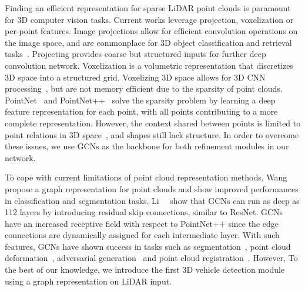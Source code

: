 \documentclass[10pt,twocolumn,letterpaper]{article}
\begin{document}
Finding an efficient representation for sparse LiDAR point clouds is paramount for 3D computer vision tasks. 
Current works leverage projection, voxelization or per-point features.
Image projections allow for efficient convolution operations on the image space, and are commonplace for 3D object classification and retrieval tasks~\cite{su2015multi,qi2016volumetric,tatarchenko2018tangent}.
Projecting provides coarse but structured inputs for further deep convolution network.
Voxelization is a volumetric representation that discretizes 3D space into a structured grid.
Voxelizing 3D space allows for 3D CNN processing~\cite{wu20153d,maturana2015voxnet,riegler2017octnet}, but are not memory efficient due to the sparsity of point clouds.
PointNet~\cite{qi2017pointnet} and PointNet++~\cite{qi2017pointnet++} solve the sparsity problem by learning a deep feature representation for each point, with all points contributing to a more complete representation.
However, the context shared between points is limited to point relations in 3D space~\cite{qi2017pointnet++}, and shapes still lack structure.
In order to overcome these issues, we use GCNs as the backbone for both refinement modules in our network.










To cope with current limitations of point cloud representation methods, Wang~\etal~\cite{wang2019dynamic} propose a graph representation for point clouds and show improved performances in classification and segmentation tasks.
Li~\etal~\cite{li2019deepgcns_journal} show that GCNs can run as deep as 112 layers by introducing residual skip connections, similar to ResNet. 
GCNs have an increased receptive field with respect to PointNet++\cite{qi2017pointnet++} since the edge connections are dynamically assigned for each intermediate layer.
With such features, GCNs have shown success in tasks such as
segmentation~\cite{Wang_2019_CVPR},
point cloud deformation~\cite{Nguyen_2019_ICCV},
adversarial generation~\cite{Shu_2019_ICCV} and
point cloud registration~\cite{wang2019deep}.
However, To the best of our knowledge, we introduce the first 3D vehicle detection module using a graph representation on LiDAR input.
\end{document}
